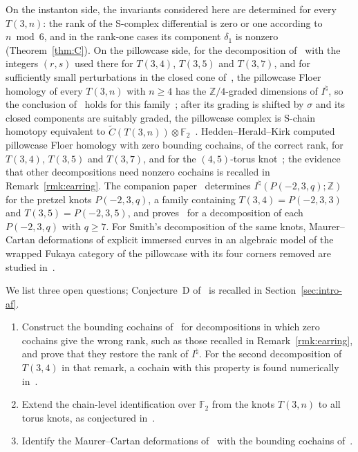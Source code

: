 \documentclass[11pt,reqno]{amsart}
\theoremstyle{plain}
\theoremstyle{definition}
\newcommand{\Z}{\mathbb{Z}}
\newcommand{\Inat}{I^{\natural}}
\begin{document}
On the instanton side, the invariants considered here are determined for every $T(3,n)$: the rank of the
S-complex differential is zero or one according to $n\bmod6$, and in the rank-one cases its component $\delta_1$ is
nonzero (Theorem~\ref{thm:C}). On the pillowcase side, for the decomposition of~\cite[\S10]{HHK2} with the
integers $(r,s)$ used there for $T(3,4)$, $T(3,5)$ and $T(3,7)$, and for sufficiently small perturbations in
the closed cone of~\cite[Def.~5.5]{WuebbenV}, the pillowcase Floer homology of every $T(3,n)$ with $n\ge4$ has
the $\Z/4$-graded dimensions of $\Inat$, so the conclusion of~\cite[Conj.~6.5]{HHK2} holds for this
family~\cite[Cor.~1.2]{WuebbenV}; after its grading is shifted by $\sigma$ and its closed components are
suitably graded, the pillowcase complex is S-chain homotopy equivalent to
$\widetilde C(T(3,n))\otimes\mathbb F_2$~\cite[Thm.~1.3]{WuebbenV}. Hedden--Herald--Kirk computed
pillowcase Floer homology with zero bounding cochains, of the correct rank, for $T(3,4)$, $T(3,5)$ and
$T(3,7)$, and for the $(4,5)$-torus knot~\cite[\S\S11.2, 11.6--11.8]{HHK2}; the evidence that other
decompositions need nonzero cochains is recalled in Remark~\ref{rmk:earring}. The companion paper~\cite{WuebbenII} determines $\Inat(P(-2,3,q);\Z)$ for the pretzel knots $P(-2,3,q)$, a family
containing $T(3,4)=P(-2,3,3)$ and $T(3,5)=P(-2,3,5)$, and proves~\cite[Conj.~6.5]{HHK2} for a decomposition of each
$P(-2,3,q)$ with $q\ge7$. For Smith's decomposition of the same knots, Maurer--Cartan deformations of explicit
immersed curves in an algebraic model of the wrapped Fukaya category of the pillowcase with its four corners
removed are studied in~\cite{WuebbenIIb}.

We list three open questions; Conjecture~D of~\cite{CHKK} is recalled in Section~\ref{sec:intro-af}.
\begin{enumerate}
\item Construct the bounding cochains of~\cite[Conj.~D]{CHKK} for decompositions in which zero cochains give
the wrong rank, such as those recalled in Remark~\ref{rmk:earring}, and prove that they restore the rank of
$\Inat$. For the second decomposition of $T(3,4)$ in that remark, a cochain with this property is found
numerically in~\cite[\S7]{WuebbenV}.
\item Extend the chain-level identification over $\mathbb F_2$ from the knots $T(3,n)$ to all torus knots, as
conjectured in~\cite[Conj.~1.5]{WuebbenIV}.
\item Identify the Maurer--Cartan deformations of~\cite{WuebbenIIb} with the bounding cochains of~\cite{CHKK}.
\end{enumerate}
\end{document}
